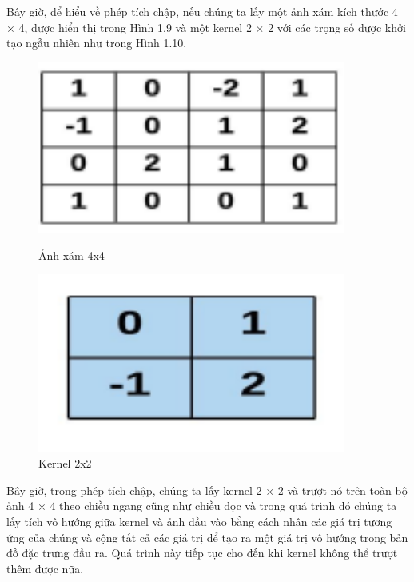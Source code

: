 \begin{enumerate}
    Bây giờ, để hiểu về phép tích chập, nếu chúng ta lấy một ảnh xám kích thước 4 × 4, được hiển thị trong Hình 1.9 và một kernel 2 × 2 với các trọng số được khởi tạo ngẫu nhiên như trong Hình 1.10.
    \begin{figure}[h]
    \centering
    \begin{minipage}{0.45\textwidth}
        \centering
        \includegraphics[width=0.9\textwidth]{images/image_gray.png} %
        \caption{Ảnh xám 4x4}
    \end{minipage}\hfill
    \begin{minipage}{0.45\textwidth}
        \centering
        \includegraphics[width=0.9\textwidth]{images/kernel_2x2.png} %
        \caption{Kernel 2x2}
    \end{minipage}
    \end{figure}

    Bây giờ, trong phép tích chập, chúng ta lấy kernel 2 × 2 và trượt nó trên toàn bộ ảnh 4 × 4 theo chiều ngang cũng như chiều dọc và trong quá trình đó chúng ta lấy tích vô hướng giữa kernel và ảnh đầu vào bằng cách nhân các giá trị tương ứng của chúng và cộng tất cả các giá trị để tạo ra một giá trị vô hướng trong bản đồ đặc trưng đầu ra. Quá trình này tiếp tục cho đến khi kernel không thể trượt thêm được nữa.


\end{enumerate}
